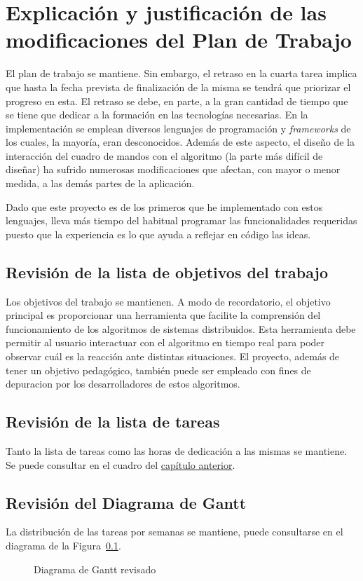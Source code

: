 \chapter*{Explicación y justificación de las modificaciones del Plan de Trabajo}

El plan de trabajo se mantiene. Sin embargo, el retraso en la cuarta tarea implica que hasta la fecha prevista de finalización de la misma se tendrá que priorizar el progreso en esta. El retraso se debe, en parte, a la gran cantidad de tiempo que se tiene que dedicar a la formación en las tecnologías necesarias. En la implementación se emplean diversos lenguajes de programación y \textit{frameworks} de los cuales, la mayoría, eran desconocidos. Además de este aspecto, el diseño de la interacción del cuadro de mandos con el algoritmo (la parte más difícil de diseñar) ha sufrido numerosas modificaciones que afectan, con mayor o menor medida, a las demás partes de la aplicación.

Dado que este proyecto es de los primeros que he implementado con estos lenguajes, lleva más tiempo del habitual programar las funcionalidades requeridas puesto que la experiencia es lo que ayuda a reflejar en código las ideas.

\section{Revisión de la lista de objetivos del trabajo}

Los objetivos del trabajo se mantienen. A modo de recordatorio, el objetivo principal es proporcionar una herramienta que facilite la comprensión del funcionamiento de los algoritmos de sistemas distribuidos. Esta herramienta debe permitir al usuario interactuar con el algoritmo en tiempo real para poder observar cuál es la reacción ante distintas situaciones. El proyecto, además de tener un objetivo pedagógico, también puede ser empleado con fines de depuracion por los desarrolladores de estos algoritmos.

\section{Revisión de la lista de tareas}

Tanto la lista de tareas como las horas de dedicación a las mismas se mantiene. Se puede consultar en el cuadro del \hyperref[ch:trabajo_realizado]{capítulo anterior}.

\section{Revisión del Diagrama de Gantt}

La distribución de las tareas por semanas se mantiene, puede consultarse en el diagrama de la Figura~\ref{revision_gantt}.

\begin{figure}[H]
	{\fontsize{3}{4}\selectfont
		\centering
    	\def\svgscale{0.26}
    	
    	\caption{Diagrama de Gantt revisado}
    	\label{revision_gantt}
	}
\end{figure}
